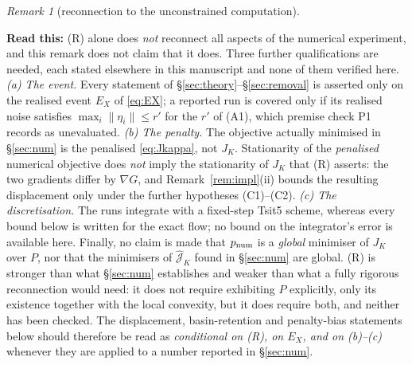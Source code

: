 \documentclass[11pt]{article}
\theoremstyle{remark}\newtheorem{remark}{Remark}
\newcommand{\norm}[1]{\lVert #1\rVert}
\newcommand{\hatJ}{\hat{\mathcal J}}
\newcommand{\readthis}[1]{\textbf{Read this:} #1}
\begin{document}
\begin{remark}[reconnection to the unconstrained computation]
\begin{enumerate}[nosep,label=(\roman*)]
\end{enumerate}
\readthis{(R) alone does \emph{not} reconnect all aspects of the numerical experiment, and this remark does not claim that it does. Three further qualifications are needed, each stated elsewhere in this manuscript and none of them verified here. \emph{(a) The event.} Every statement of \S\ref{sec:theory}--\S\ref{sec:removal} is asserted only on the realised event $E_X$ of \eqref{eq:EX}; a reported run is covered only if its realised noise satisfies $\max_i\norm{\eta_i}\le r'$ for the $r'$ of (A1), which premise check P1 records as unevaluated. \emph{(b) The penalty.} The objective actually minimised in \S\ref{sec:num} is the penalised \eqref{eq:Jkappa}, not $J_K$. Stationarity of the \emph{penalised} numerical objective does \emph{not} imply the stationarity of $J_K$ that (R) asserts: the two gradients differ by $\nabla G$, and Remark~\ref{rem:impl}(ii) bounds the resulting displacement only under the further hypotheses (C1)--(C2). \emph{(c) The discretisation.} The runs integrate with a fixed-step Tsit5 scheme, whereas every bound below is written for the exact flow; no bound on the integrator's error is available here. Finally, no claim is made that $p_{\rm num}$ is a \emph{global} minimiser of $J_K$ over $P$, nor that the minimisers of $\hatJ_K$ found in \S\ref{sec:num} are global. (R) is stronger than what \S\ref{sec:num} establishes and weaker than what a fully rigorous reconnection would need: it does not require exhibiting $P$ explicitly, only its existence together with the local convexity, but it does require both, and neither has been checked. The displacement, basin-retention and penalty-bias statements below should therefore be read as \emph{conditional on (R), on $E_X$, and on (b)--(c)} whenever they are applied to a number reported in \S\ref{sec:num}.}
\end{remark}
\end{document}
